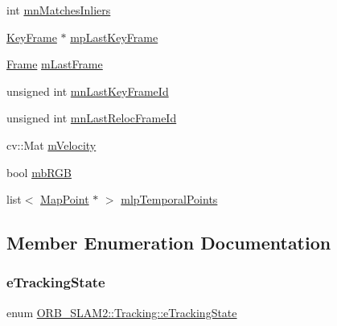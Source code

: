 \begin{DoxyCompactItemize}
\item 
int \mbox{\hyperlink{class_o_r_b___s_l_a_m2_1_1_tracking_ad58b66226a6345581227560aae2ea72f}{mn\+Matches\+Inliers}}
\item 
\mbox{\hyperlink{class_o_r_b___s_l_a_m2_1_1_key_frame}{Key\+Frame}} $\ast$ \mbox{\hyperlink{class_o_r_b___s_l_a_m2_1_1_tracking_aa833de1f76843c64dbcc1631c12de7fd}{mp\+Last\+Key\+Frame}}
\item 
\mbox{\hyperlink{class_o_r_b___s_l_a_m2_1_1_frame}{Frame}} \mbox{\hyperlink{class_o_r_b___s_l_a_m2_1_1_tracking_a4f0a80cfb3ddadcb43d7745d15ac9f35}{m\+Last\+Frame}}
\item 
unsigned int \mbox{\hyperlink{class_o_r_b___s_l_a_m2_1_1_tracking_abe5270bc94032722923f43efe7a7bac6}{mn\+Last\+Key\+Frame\+Id}}
\item 
unsigned int \mbox{\hyperlink{class_o_r_b___s_l_a_m2_1_1_tracking_af95975f569dcc3e378c556b8199604b2}{mn\+Last\+Reloc\+Frame\+Id}}
\item 
cv\+::\+Mat \mbox{\hyperlink{class_o_r_b___s_l_a_m2_1_1_tracking_ac2283c13ccf08207c90a6a163d8dbe3c}{m\+Velocity}}
\item 
bool \mbox{\hyperlink{class_o_r_b___s_l_a_m2_1_1_tracking_a01522faf940cc80402f0750b0d90ecf2}{mb\+R\+GB}}
\item 
list$<$ \mbox{\hyperlink{class_o_r_b___s_l_a_m2_1_1_map_point}{Map\+Point}} $\ast$ $>$ \mbox{\hyperlink{class_o_r_b___s_l_a_m2_1_1_tracking_aadc2690944688adbebeef4a60bdf3cad}{mlp\+Temporal\+Points}}
\end{DoxyCompactItemize}


\subsection{Member Enumeration Documentation}
\mbox{\label{class_o_r_b___s_l_a_m2_1_1_tracking_a3995b5e23b910c6ee30b7fe21732fe36}} 
\subsubsection{\texorpdfstring{e\+Tracking\+State}{eTrackingState}}
{\footnotesize\ttfamily enum \mbox{\hyperlink{class_o_r_b___s_l_a_m2_1_1_tracking_a3995b5e23b910c6ee30b7fe21732fe36}{O\+R\+B\+\_\+\+S\+L\+A\+M2\+::\+Tracking\+::e\+Tracking\+State}}}

